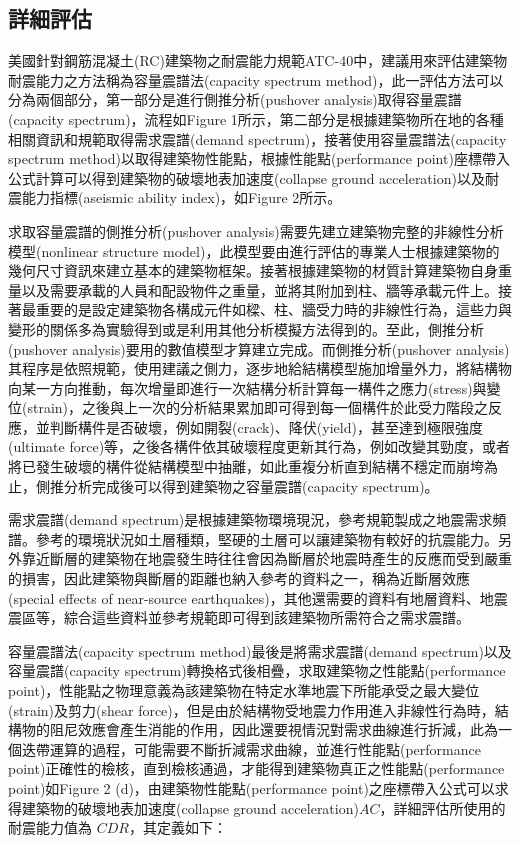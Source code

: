 \subsection{詳細評估}

美國針對鋼筋混凝土(RC)建築物之耐震能力規範ATC-40\cite{applied1996seismic}中，建議用來評估建築物耐震能力之方法稱為容量震譜法(capacity spectrum method)，此一評估方法可以分為兩個部分，第一部分是進行側推分析(pushover analysis)取得容量震譜(capacity spectrum)，流程如Figure 1所示，第二部分是根據建築物所在地的各種相關資訊和規範取得需求震譜(demand spectrum)，接著使用容量震譜法(capacity spectrum method)以取得建築物性能點，根據性能點(performance point)座標帶入公式計算可以得到建築物的破壞地表加速度(collapse ground acceleration)以及耐震能力指標(aseismic ability index)，如Figure 2所示。

求取容量震譜的側推分析(pushover analysis)需要先建立建築物完整的非線性分析模型(nonlinear structure model)，此模型要由進行評估的專業人士根據建築物的幾何尺寸資訊來建立基本的建築物框架。接著根據建築物的材質計算建築物自身重量以及需要承載的人員和配設物件之重量，並將其附加到柱、牆等承載元件上。接著最重要的是設定建築物各構成元件如樑、柱、牆受力時的非線性行為，這些力與變形的關係多為實驗得到或是利用其他分析模擬方法得到的。至此，側推分析(pushover analysis)要用的數值模型才算建立完成。而側推分析(pushover analysis)其程序是依照規範，使用建議之側力，逐步地給結構模型施加增量外力，將結構物向某一方向推動，每次增量即進行一次結構分析計算每一構件之應力(stress)與變位(strain)，之後與上一次的分析結果累加即可得到每一個構件於此受力階段之反應，並判斷構件是否破壞，例如開裂(crack)、降伏(yield)，甚至達到極限強度(ultimate force)等，之後各構件依其破壞程度更新其行為，例如改變其勁度，或者將已發生破壞的構件從結構模型中抽離，如此重複分析直到結構不穩定而崩垮為止，側推分析完成後可以得到建築物之容量震譜(capacity spectrum)。

需求震譜(demand spectrum)是根據建築物環境現況，參考規範製成之地震需求頻譜。參考的環境狀況如土層種類，堅硬的土層可以讓建築物有較好的抗震能力。另外靠近斷層的建築物在地震發生時往往會因為斷層於地震時產生的反應而受到嚴重的損害，因此建築物與斷層的距離也納入參考的資料之一，稱為近斷層效應(special effects of near-source earthquakes)，其他還需要的資料有地層資料、地震震區等，綜合這些資料並參考規範即可得到該建築物所需符合之需求震譜。

容量震譜法(capacity spectrum method)最後是將需求震譜(demand spectrum)以及容量震譜(capacity spectrum)轉換格式後相疊，求取建築物之性能點(performance point)，性能點之物理意義為該建築物在特定水準地震下所能承受之最大變位(strain)及剪力(shear force)，但是由於結構物受地震力作用進入非線性行為時，結構物的阻尼效應會產生消能的作用，因此還要視情況對需求曲線進行折減，此為一個迭帶運算的過程，可能需要不斷折減需求曲線，並進行性能點(performance point)正確性的檢核，直到檢核通過，才能得到建築物真正之性能點(performance point)如Figure 2 (d)，由建築物性能點(performance point)之座標帶入公式可以求得建築物的破壞地表加速度(collapse ground acceleration)$AC$，詳細評估所使用的耐震能力值為 $CDR$，其定義如下：

